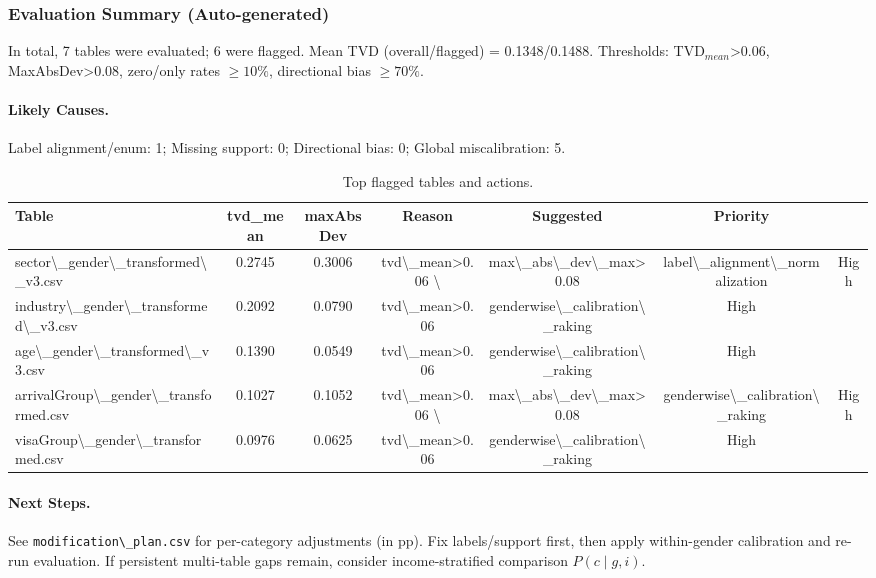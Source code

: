 \subsubsection{Evaluation Summary (Auto-generated)}
In total, 7 tables were evaluated; 6 were flagged. Mean TVD (overall/flagged) = 0.1348/0.1488. Thresholds: TVD$_{mean}$>0.06, MaxAbsDev>0.08, zero/only rates $\ge 10\%$, directional bias $\ge 70\%$.
\paragraph{Likely Causes.} Label alignment/enum: 1; Missing support: 0; Directional bias: 0; Global miscalibration: 5.
\begin{table}[h]\centering\small
\begin{tabular}{lcccccc}\toprule
Table & tvd\_mean & maxAbsDev & Reason & Suggested & Priority \\ \midrule
 sector\textbackslash{}_gender\textbackslash{}_transformed\textbackslash{}_v3.csv & 0.2745 & 0.3006 & tvd\textbackslash{}_mean>0.06 \textbackslash{}& max\textbackslash{}_abs\textbackslash{}_dev\textbackslash{}_max>0.08 & label\textbackslash{}_alignment\textbackslash{}_normalization & High \\
 industry\textbackslash{}_gender\textbackslash{}_transformed\textbackslash{}_v3.csv & 0.2092 & 0.0790 & tvd\textbackslash{}_mean>0.06 & genderwise\textbackslash{}_calibration\textbackslash{}_raking & High \\
 age\textbackslash{}_gender\textbackslash{}_transformed\textbackslash{}_v3.csv & 0.1390 & 0.0549 & tvd\textbackslash{}_mean>0.06 & genderwise\textbackslash{}_calibration\textbackslash{}_raking & High \\
 arrivalGroup\textbackslash{}_gender\textbackslash{}_transformed.csv & 0.1027 & 0.1052 & tvd\textbackslash{}_mean>0.06 \textbackslash{}& max\textbackslash{}_abs\textbackslash{}_dev\textbackslash{}_max>0.08 & genderwise\textbackslash{}_calibration\textbackslash{}_raking & High \\
 visaGroup\textbackslash{}_gender\textbackslash{}_transformed.csv & 0.0976 & 0.0625 & tvd\textbackslash{}_mean>0.06 & genderwise\textbackslash{}_calibration\textbackslash{}_raking & High \\
\bottomrule\end{tabular}\caption{Top flagged tables and actions.}\end{table}
\paragraph{Next Steps.} See \texttt{modification\textbackslash{}_plan.csv} for per-category adjustments (in pp). Fix labels/support first, then apply within-gender calibration and re-run evaluation. If persistent multi-table gaps remain, consider income-stratified comparison $P(c\mid g,i)$.